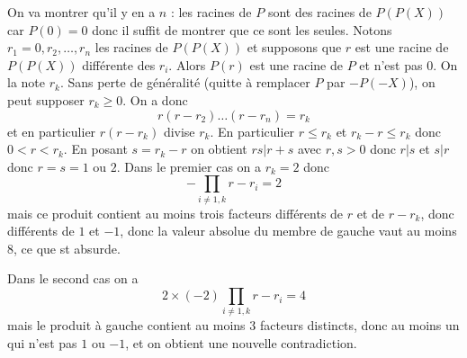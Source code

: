 \begin{sol}
On va montrer qu'il y en a $n$ : les racines de $P$ sont des racines de $P(P(X))$ car $P(0)=0$ donc il suffit de montrer que ce sont les seules. Notons $r_1=0, r_2, \dots, r_n$ les racines de $P(P(X))$ et supposons que $r$ est une racine de $P(P(X))$ différente des $r_i$. Alors $P(r)$ est une racine de $P$ et n'est pas $0$. On la note $r_k$. Sans perte de généralité (quitte à remplacer $P$ par $-P(-X)$), on peut supposer $r_k \geq 0$. On a donc
\[r(r-r_2) \dots (r-r_n)=r_k\]
et en particulier $r(r-r_k)$ divise $r_k$. En particulier $r \leq r_k$ et $r_k-r \leq r_k$ donc $0<r<r_k$. En posant $s=r_k-r$ on obtient $rs | r+s$ avec $r,s>0$ donc $r|s$ et $s|r$ donc $r=s=1$ ou $2$. Dans le premier cas on a $r_k=2$ donc 
\[-\prod_{i \ne 1,k} r-r_i =2 \]
mais ce produit contient au moins trois facteurs différents de $r$ et de $r-r_k$, donc différents de $1$ et $-1$, donc la valeur absolue du membre de gauche vaut au moins $8$, ce que st absurde.

Dans le second cas on a
\[2 \times (-2) \prod_{i \ne 1,k} r-r_i =4 \]
mais le produit à gauche contient au moins $3$ facteurs distincts, donc au moins un qui n'est pas $1$ ou $-1$, et on obtient une nouvelle contradiction.
\end{sol}
